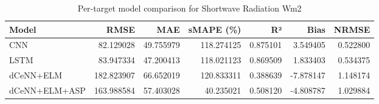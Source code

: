 \begin{table}
\caption{Per-target model comparison for Shortwave Radiation Wm2}
\begin{tabular}{lrrrrrr}
\toprule
Model & RMSE & MAE & sMAPE (\%) & R² & Bias & NRMSE \\
\midrule
CNN & 82.129028 & 49.755979 & 118.274125 & 0.875101 & 3.549405 & 0.522800 \\
LSTM & 83.947334 & 47.200413 & 118.021123 & 0.869509 & 1.833403 & 0.534375 \\
dCeNN+ELM & 182.823907 & 66.652019 & 120.833311 & 0.388639 & -7.878147 & 1.148174 \\
dCeNN+ELM+ASP & 163.988584 & 57.403028 & 40.235021 & 0.508120 & -4.808787 & 1.029884 \\
\bottomrule
\end{tabular}
\end{table}
